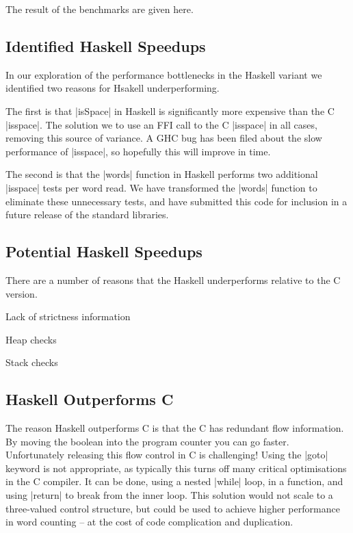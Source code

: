 \documentclass{llncs}
\begin{document}
The result of the benchmarks are given here.

\subsection{Identified Haskell Speedups}

In our exploration of the performance bottlenecks in the Haskell variant we identified two reasons for Hsakell underperforming.

The first is that |isSpace| in Haskell is significantly more expensive than the C |isspace|. The solution we to use an FFI call to the C |isspace| in all cases, removing this source of variance. A GHC bug has been filed about the slow performance of |isspace|, so hopefully this will improve in time.

The second is that the |words| function in Haskell performs two additional |isspace| tests per word read. We have transformed the |words| function to eliminate these unnecessary tests, and have submitted this code for inclusion in a future release of the standard libraries.

\subsection{Potential Haskell Speedups}

There are a number of reasons that the Haskell underperforms relative to the C version.

Lack of strictness information

Heap checks

Stack checks

\subsection{Haskell Outperforms C}

The reason Haskell outperforms C is that the C has redundant flow information. By moving the boolean into the program counter you can go faster. Unfortunately releasing this flow control in C is challenging! Using the |goto| keyword is not appropriate, as typically this turns off many critical optimisations in the C compiler. It can be done, using a nested |while| loop, in a function, and using |return| to break from the inner loop. This solution would not scale to a three-valued control structure, but could be used to achieve higher performance in word counting -- at the cost of code complication and duplication.
\end{document}
